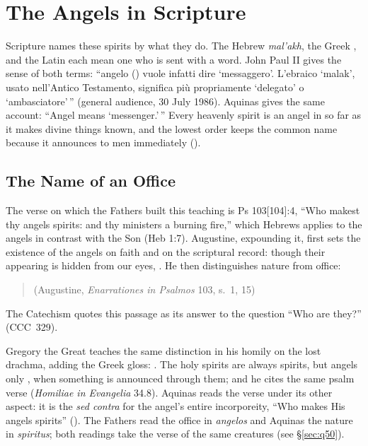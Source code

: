 \section{The Angels in Scripture}\label{sec:scripture}

Scripture names these spirits by what they do. The Hebrew \emph{mal'akh},
the Greek , and the Latin  each mean one who is
sent with a word. John Paul II gives the sense of both terms: ``angelo
() vuole infatti dire `messaggero'. L'ebraico `malak',
usato nell'Antico Testamento, significa più propriamente `delegato' o
`ambasciatore'\,'' (general audience, 30 July 1986). Aquinas gives the same account: ``Angel means
`messenger.'\,'' Every heavenly spirit is an angel in so far as it makes
divine things known, and the lowest order keeps the common name because it
announces to men immediately ().

\subsection{The Name of an Office}

The verse on which the Fathers built this teaching is Ps 103[104]:4, ``Who
makest thy angels spirits: and thy ministers a burning fire,'' which
Hebrews applies to the angels in contrast with the Son (Heb 1:7).
Augustine, expounding it, first sets the existence of the angels on faith
and on the scriptural record: though their appearing is hidden from our
eyes, . He then distinguishes nature from office:

\begin{quote}
(Augustine, \emph{Enarrationes in Psalmos} 103, s.~1, 15)
\end{quote}

\noindent The Catechism quotes this passage as its answer to the question
``Who are they?'' (CCC~329).

Gregory the Great teaches the same distinction in his homily on the lost
drachma, adding the Greek gloss: . The holy spirits are always
spirits, but angels only ,
when something is announced through them; and he cites the same psalm
verse (\emph{Homiliae in Evangelia} 34.8). Aquinas reads the verse under
its other aspect: it is the \emph{sed contra} for the angel's entire
incorporeity, ``Who makes His angels spirits'' (). The
Fathers read the office in \emph{angelos} and Aquinas the nature in
\emph{spiritus}; both readings take the verse of the same creatures (see
\S\ref{sec:q50}).

